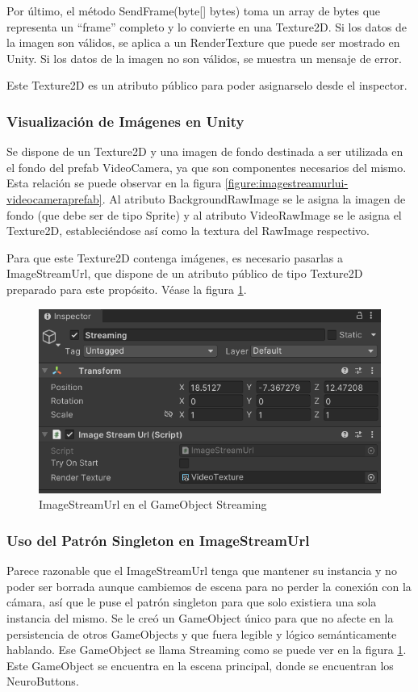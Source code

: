 Por último, el método SendFrame(byte[] bytes) toma un array de bytes que representa un ``frame'' completo y lo convierte en una Texture2D. Si los datos de la imagen son válidos, se aplica a un RenderTexture que puede ser mostrado en Unity. Si los datos de la imagen no son válidos, se muestra un mensaje de error.



Este Texture2D es un atributo público para poder asignarselo desde el inspector.


\subsubsection{Visualización de Imágenes en Unity}

Se dispone de un Texture2D y una imagen de fondo destinada a ser utilizada en el fondo del prefab VideoCamera, ya que son componentes necesarios del mismo. Esta relación se puede observar en la figura \ref{figure:imagestreamurlui-videocameraprefab}. Al atributo BackgroundRawImage se le asigna la imagen de fondo (que debe ser de tipo Sprite) y al atributo VideoRawImage se le asigna el Texture2D, estableciéndose así como la textura del RawImage respectivo.



Para que este Texture2D contenga imágenes, es necesario pasarlas a ImageStreamUrl, que dispone de un atributo público de tipo Texture2D preparado para este propósito. Véase la figura \ref{figure:imagestreamurl}.

\begin{figure}[!htb]
   \centering
    \includegraphics[width=0.75\linewidth]{figures/imagestreamurl.png}
   \caption{ImageStreamUrl en el GameObject Streaming}
   \label{figure:imagestreamurl}
\end{figure}


\subsubsection{Uso del Patrón Singleton en ImageStreamUrl}
Parece razonable que el ImageStreamUrl tenga que mantener su instancia y no poder ser borrada aunque cambiemos de escena para no perder la conexión con la cámara, así que le puse el patrón singleton para que solo existiera una sola instancia del mismo. Se le creó un GameObject único para que no afecte en la persistencia de otros GameObjects y que fuera legible y lógico semánticamente hablando. Ese GameObject se llama Streaming como se puede ver en la figura \ref{figure:imagestreamurl}. Este GameObject se encuentra en la escena principal, donde se encuentran los NeuroButtons.




